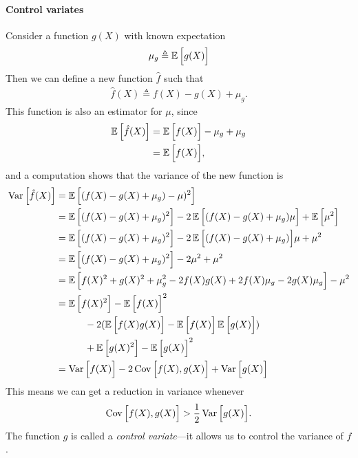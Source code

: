 \paragraph{Control variates} Consider a function $g(X)$ with known expectation
\begin{align*}
    \mu_{g} \triangleq \operatorname{\mathbb{E}} \Big[ g(X) \Big]
\end{align*}
Then we can define a new function $\hat{f}$ such that
\begin{align*}
    \hat{f}(X) \triangleq f(X) - g(X) + \mu_{g}.
\end{align*}
This function is also an estimator for $\mu$, since
\begin{align*}
    \operatorname{\mathbb{E}} \Big[ \hat{f}(X) \Big] &= \operatorname{\mathbb{E}} \Big[ f(X) \Big] - \mu_{g} + \mu_{g} \\
        &= \operatorname{\mathbb{E}} \Big[ f(X) \Big],
\end{align*}
and a computation shows that the variance of the new function is
\begin{align*}
    \operatorname{Var} \Big[ \hat{f}(X) \Big] &= \operatorname{\mathbb{E}} \Big[ (f(X) - g(X) + \mu_{g}) - \mu)^2 \Big] \\
    &= \operatorname{\mathbb{E}} \Big[ (f(X) - g(X) + \mu_{g})^2 \Big] - 2\operatorname{\mathbb{E}} \Big[ (f(X) - g(X) + \mu_{g})\mu \Big] + \operatorname{\mathbb{E}} \Big[ \mu^2 \Big] \\
    &= \operatorname{\mathbb{E}} \Big[ (f(X) - g(X) + \mu_{g})^2 \Big] - 2\operatorname{\mathbb{E}} \Big[ (f(X) - g(X) + \mu_{g})\Big]\mu + \mu^2 \\
    &= \operatorname{\mathbb{E}} \Big[ (f(X) - g(X) + \mu_{g})^2 \Big] - 2\mu^2  + \mu^2 \\
    &= \operatorname{\mathbb{E}} \Big[ f(X)^2 + g(X)^2 + \mu_{g}^2 - 2f(X)g(X) + 2f(X)\mu_{g} - 2g(X)\mu_{g} \Big] - \mu^2\\
    &= \operatorname{\mathbb{E}} \Big[ f(X)^2 \Big] - \operatorname{\mathbb{E}} \Big[ f(X) \Big]^2 \\
    &\quad\qquad - 2(\operatorname{\mathbb{E}} \Big[ f(X)g(X) \Big] - \operatorname{\mathbb{E}} \Big[ f(X) \Big]\operatorname{\mathbb{E}} \Big[ g(X) \Big]) \\
    &\quad\qquad + \operatorname{\mathbb{E}} \Big[ g(X)^2 \Big] - \operatorname{\mathbb{E}} \Big[ g(X) \Big]^2 \\
    &= \operatorname{Var} \Big[ f(X) \Big] - 2  \operatorname{Cov} \Big[ f(X), g(X) \Big] + \operatorname{Var} \Big[ g(X) \Big]
\end{align*}
This means we can get a reduction in variance whenever
\begin{align*}
    \operatorname{Cov} \Big[ f(X), g(X) \Big] > \frac{1}{2} \operatorname{Var} \Big[ g(X) \Big].
\end{align*}
The function $g$ is called a \textit{control variate}---it allows us to control the variance of $f$.

